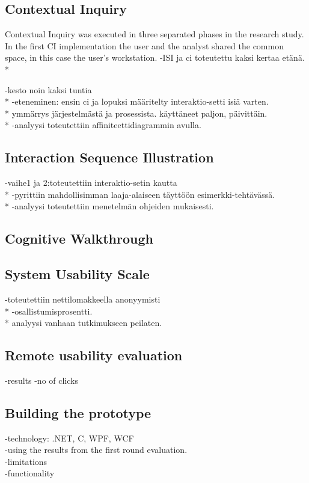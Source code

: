\documentclass[12pt,a4paper,oneside,pdftex]{report}
\begin{document}
\subsection{Contextual Inquiry}
Contextual Inquiry was executed in three separated phases in the research study. In the first CI implementation the user and the analyst shared the common space, in this case the user's workstation. 
-ISI ja ci toteutettu  kaksi kertaa etänä.
 \\*
	  
	 -kesto noin kaksi tuntia
	  \\*
	  -eteneminen: ensin ci ja lopuksi määritelty interaktio-setti isiä varten.
	  \\*
	   ymmärrys järjestelmästä ja prosessista. käyttäneet paljon, päivittäin.
	  \\*
	  -analyysi toteutettiin affiniteettidiagrammin avulla.
	  
	  \subsection{Interaction Sequence Illustration}

	  -vaihe1 ja 2:toteutettiin interaktio-setin kautta
	  \\*
	  -pyrittiin mahdollisimman laaja-alaiseen täyttöön esimerkki-tehtävässä.
	  \\*
	  -analyysi toteutettiin menetelmän ohjeiden mukaisesti.
	
	  \subsection{Cognitive Walkthrough}
	  \subsection{System Usability Scale}
	  -toteutettiin nettilomakkeella anonyymisti
	  \\*
	  -osallistumisprosentti.
	  \\*
	  analyysi vanhaan tutkimukseen peilaten.
	  \subsection{Remote usability evaluation}
	  -results 
	  -no of clicks 
	\subsection{Building the prototype}
	-technology: .NET, C, WPF, WCF
	\\
	-using the results from the first round evaluation.
	\\
	-limitations
	\\
	-functionality
    	
\end{document}
